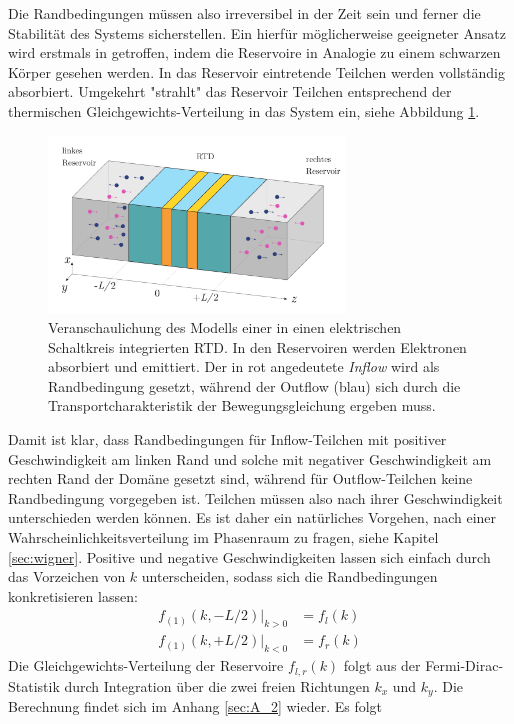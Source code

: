 Die Randbedingungen müssen also irreversibel in der Zeit sein und ferner die Stabilität des Systems sicherstellen. Ein hierfür möglicherweise geeigneter Ansatz wird erstmals in \cite{frensley2} getroffen, indem die Reservoire in Analogie zu einem schwarzen Körper gesehen werden. In das Reservoir eintretende Teilchen werden vollständig absorbiert. Umgekehrt "strahlt" das Reservoir Teilchen entsprechend der thermischen Gleichgewichts-Verteilung in das System ein, siehe Abbildung \ref{fig:modell}.
\begin{figure}
  \centering
  \includegraphics[width=0.7\textwidth]{files/RTD_reservoire.pdf}
  \caption{Veranschaulichung des Modells einer in einen elektrischen Schaltkreis integrierten RTD. In den Reservoiren werden Elektronen absorbiert und emittiert. Der in rot angedeutete \emph{Inflow} wird als Randbedingung gesetzt, während der Outflow (blau) sich durch die Transportcharakteristik der Bewegungsgleichung ergeben muss.}
  \label{fig:modell}
\end{figure}
Damit ist klar, dass Randbedingungen für Inflow-Teilchen mit positiver Geschwindigkeit am linken Rand und solche mit negativer Geschwindigkeit am rechten Rand der Domäne gesetzt sind, während für Outflow-Teilchen keine Randbedingung vorgegeben ist. Teilchen müssen also nach ihrer Geschwindigkeit unterschieden werden können.
Es ist daher ein natürliches Vorgehen, nach einer Wahrscheinlichkeitsverteilung im Phasenraum zu fragen, siehe Kapitel \ref{sec:wigner}.
Positive und negative Geschwindigkeiten lassen sich einfach durch das Vorzeichen von $k$ unterscheiden, sodass sich die Randbedingungen konkretisieren lassen:
\begin{equation}
  \begin{aligned}
    f_{(1)}(k,-L/2)|_{k>0} &= f_l({k}) \\
    f_{(1)}(k,+L/2)|_{k<0} &= f_r({k})
  \end{aligned}
  \label{eq:rb1}
\end{equation}
Die Gleichgewichts-Verteilung der Reservoire $f_{l,r}(k)$ folgt aus der Fermi-Dirac-Statistik durch Integration über die zwei freien Richtungen $k_x$ und $k_y$. Die Berechnung findet sich im Anhang \ref{sec:A_2} wieder. Es folgt
